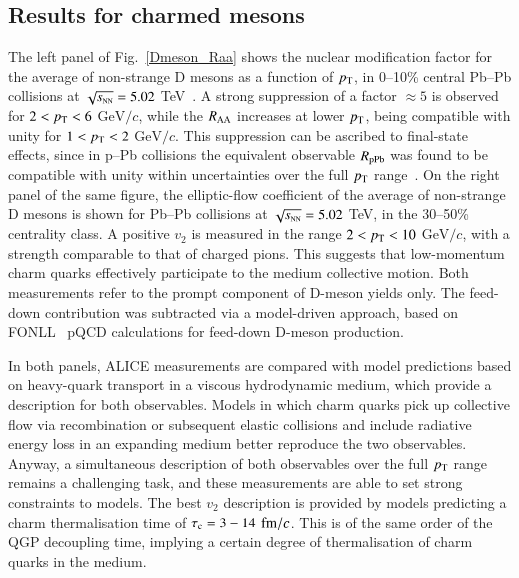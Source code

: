 \documentclass{webofc}
\newcommand{\sqrtsNN}{\sqrt{s_{\rm \scriptscriptstyle NN}}}
\newcommand{\gevc}{\mathrm{GeV}/c}
\newcommand{\pt}{p_{\rm T}}
\begin{document}
\subsection{Results for charmed mesons}
\label{sub1}
The left panel of Fig.~\ref{Dmeson_Raa} shows the nuclear modification factor for the average of non-strange D mesons as a function of $\pt$, in 0--10\% central Pb--Pb collisions at $\sqrtsNN = 5.02$ TeV~\cite{Acharya:2018hre}. A strong suppression of a factor $\approx5$ is observed for $2 < \pt < 6$ $\gevc$, while the $R_{\rm AA}$ increases at lower $\pt$, being compatible with unity for $1 < \pt < 2$ $\gevc$. This suppression can be ascribed to final-state effects, since in p--Pb collisions the equivalent observable $R_{\rm pPb}$ was found to be compatible with unity within uncertainties over the full $\pt$ range~\cite{Adam:2016ich}.
On the right panel of the same figure, the elliptic-flow coefficient of the average of non-strange D mesons is shown for Pb--Pb collisions at $\sqrtsNN = 5.02$ TeV, in the 30--50\% centrality class. A positive $v_2$ is measured in the range $2 < \pt < 10$ $\gevc$, with a strength comparable to that of charged pions. This suggests that low-momentum charm quarks effectively participate to the medium collective motion.
Both measurements refer to the prompt component of D-meson yields only. The feed-down contribution was subtracted via a model-driven approach, based on FONLL~\cite{Cacciari:1998it} pQCD calculations for feed-down D-meson production.

In both panels, ALICE measurements are compared with model predictions based on heavy-quark transport in a viscous hydrodynamic medium, which provide a description for both observables. Models in which charm quarks pick up collective flow via recombination or subsequent elastic collisions and include radiative energy loss in an expanding medium better reproduce the two observables. Anyway, a simultaneous description of both observables over the full $\pt$ range remains a challenging task, and these measurements are able to set strong constraints to models.
The best $v_2$ description is provided by models predicting a charm thermalisation time of $\tau_{\rm c} = 3 - 14$ ${\rm fm}/c$. This is of the same order of the QGP decoupling time, implying a certain degree of thermalisation of charm quarks in the medium.
\end{document}
